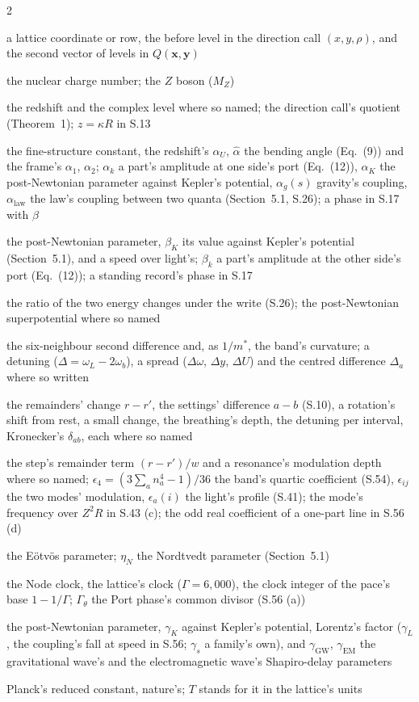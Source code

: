 \documentclass[pdflatex,sn-mathphys-num]{sn-jnl}
\newcommand{\nom}[2]{\item[{#1}] #2}
\theoremstyle{thmstyleone}
\begin{document}
\begin{multicols}{2}
\begin{description}[style=unboxed,leftmargin=0pt,itemsep=0pt,parsep=0pt,font=\normalfont]
\nom{$y$}{a lattice coordinate or row, the before level in the direction call $(x, y, \rho)$, and the second vector of levels in $Q(\mathbf x, \mathbf y)$}
\nom{$Z$}{the nuclear charge number; the $Z$ boson ($M_Z$)}
\nom{$z$}{the redshift and the complex level where so named; the direction call's quotient (Theorem~1); $z = \kappa R$ in S.13}
\nom{$\alpha$}{the fine-structure constant, the redshift's $\alpha_U$, $\hat\alpha$ the bending angle (Eq.~(9)) and the frame's $\alpha_1$, $\alpha_2$; $\alpha_k$ a part's amplitude at one side's port (Eq.~(12)), $\alpha_K$ the post-Newtonian parameter against Kepler's potential, $\alpha_g(s)$ gravity's coupling, $\alpha_{\mathrm{law}}$ the law's coupling between two quanta (Section~5.1, S.26); a phase in S.17 with $\beta$}
\nom{$\beta$}{the post-Newtonian parameter, $\beta_K$ its value against Kepler's potential (Section~5.1), and a speed over light's; $\beta_k$ a part's amplitude at the other side's port (Eq.~(12)); a standing record's phase in S.17}
\nom{$\chi$}{the ratio of the two energy changes under the write (S.26); the post-Newtonian superpotential where so named}
\nom{$\Delta$}{the six-neighbour second difference and, as $1 / m^*$, the band's curvature; a detuning ($\Delta = \omega_L - 2\omega_b$), a spread ($\Delta\omega$, $\Delta y$, $\Delta U$) and the centred difference $\Delta_a$ where so written}
\nom{$\delta$}{the remainders' change $r - r'$, the settings' difference $a - b$ (S.10), a rotation's shift from rest, a small change, the breathing's depth, the detuning per interval, Kronecker's $\delta_{ab}$, each where so named}
\nom{$\epsilon$}{the step's remainder term $(r - r') / w$ and a resonance's modulation depth where so named; $\epsilon_4 = (3\sum_a n_a^4 - 1) / 36$ the band's quartic coefficient (S.54), $\epsilon_{ij}$ the two modes' modulation, $\epsilon_a(i)$ the light's profile (S.41); the mode's frequency over $Z^2 R$ in S.43 (c); the odd real coefficient of a one-part line in S.56 (d)}
\nom{$\eta$}{the E\"otv\"os parameter; $\eta_N$ the Nordtvedt parameter (Section~5.1)}
\nom{$\Gamma$}{the Node clock, the lattice's clock ($\Gamma = 6{,}000$), the clock integer of the pace's base $1 - 1 / \Gamma$; $\Gamma_\theta$ the Port phase's common divisor (S.56 (a))}
\nom{$\gamma$}{the post-Newtonian parameter, $\gamma_K$ against Kepler's potential, Lorentz's factor ($\gamma_L$, the coupling's fall at speed in S.56; $\gamma_s$ a family's own), and $\gamma_{\mathrm{GW}}$, $\gamma_{\mathrm{EM}}$ the gravitational wave's and the electromagnetic wave's Shapiro-delay parameters}
\nom{$\hbar$}{Planck's reduced constant, nature's; $T$ stands for it in the lattice's units}

\end{description}
\end{multicols}
\end{document}
